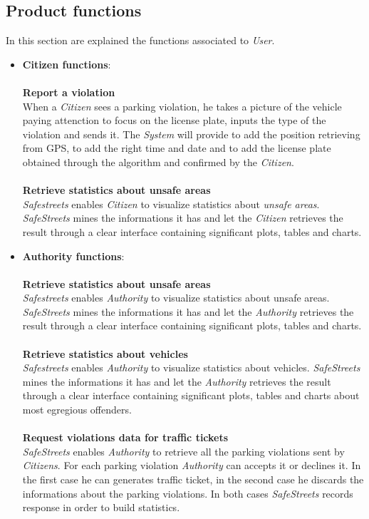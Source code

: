 \documentclass{article}
\begin{document}
\subsection{Product functions}
In this section are explained the functions associated to \textit{User}.
\begin{itemize}
    \item \textbf{Citizen functions}:
    \\
    \\
    \textbf{Report a violation}
    \\When a \textit{Citizen} sees a parking violation, he takes a picture of the vehicle paying attenction to focus on the 
    license plate, inputs the type of the violation and sends it. The \textit{System} will provide to add the position retrieving 
    from GPS, to add the right time and date and to add the license plate obtained through the algorithm and confirmed by
    the \textit{Citizen}. 
    \\
    \\
    \textbf{Retrieve statistics about unsafe areas}
    \\\textit{Safestreets} enables \textit{Citizen} to visualize statistics about \textit{unsafe areas}. \textit{SafeStreets} 
    mines the informations it has and let the \textit{Citizen} retrieves the result through a clear interface containing 
    significant plots, tables and charts. 

    \item \textbf{Authority functions}:
    \\
    \\
    \textbf{Retrieve statistics about unsafe areas}
    \\\textit{Safestreets} enables \textit{Authority} to visualize statistics about unsafe areas. \textit{SafeStreets} mines the 
    informations it has and let the \textit{Authority} retrieves the result through a clear interface containing significant plots, 
    tables and charts.
    \\
    \\
    \textbf{Retrieve statistics about vehicles}
    \\\textit{Safestreets} enables \textit{Authority} to visualize statistics about vehicles. \textit{SafeStreets} mines the 
    informations it has and let the \textit{Authority} retrieves the result through a clear interface containing 
    significant plots, tables and charts about most egregious offenders.
    \\
    \\
    \textbf{Request violations data for traffic tickets}
    \\\textit{SafeStreets} enables \textit{Authority} to retrieve all the parking violations sent by \textit{Citizens}. For each 
    parking violation \textit{Authority} can accepts it or declines it. In the first case he can generates traffic ticket, 
    in the second case he discards the informations about the parking violations. In both cases \textit{SafeStreets} records 
    response in order to build statistics.

\end{itemize}
\end{document}

